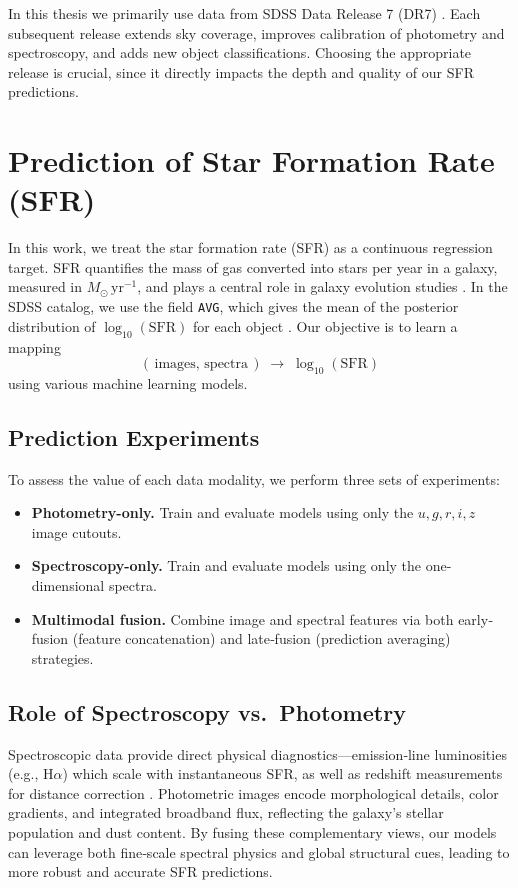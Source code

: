 \documentclass[english,bachelor,oneside]{ctufit-thesis}
\begin{document}
In this thesis we primarily use data from SDSS Data Release 7 (DR7) \cite{SDSSData19:online}.  
Each subsequent release extends sky coverage, improves calibration of photometry and spectroscopy,  
and adds new object classifications. Choosing the appropriate release is crucial,  
since it directly impacts the depth and quality of our SFR predictions.

\section{Prediction of Star Formation Rate (SFR)} 
In this work, we treat the star formation rate (SFR) as a continuous regression target.  
SFR quantifies the mass of gas converted into stars per year in a galaxy, measured in  
$M_{\odot}\,\mathrm{yr}^{-1}$, and plays a central role in galaxy evolution studies  
\cite{kennicutt1998star}. In the SDSS catalog, we use the field \texttt{AVG}, which gives  
the mean of the posterior distribution of $\log_{10}(\mathrm{SFR})$ for each object  
\cite{Rawdata46:online}. Our objective is to learn a mapping 
\[
  (\,\text{images},\,\text{spectra}\,)\;\longrightarrow\;\log_{10}(\mathrm{SFR})
\]
using various machine learning models.

\subsection{Prediction Experiments} %
To assess the value of each data modality, we perform three sets of experiments:
\begin{itemize}
  \item \textbf{Photometry-only.} Train and evaluate models using only the $u,g,r,i,z$ image cutouts.
  \item \textbf{Spectroscopy-only.} Train and evaluate models using only the one-dimensional spectra.
  \item \textbf{Multimodal fusion.} Combine image and spectral features via both early‐fusion  
        (feature concatenation) and late‐fusion (prediction averaging) strategies.
\end{itemize}

\subsection{Role of Spectroscopy vs.\ Photometry} %
Spectroscopic data provide direct physical diagnostics—emission‐line luminosities (e.g., H$\alpha$)  
which scale with instantaneous SFR, as well as redshift measurements for distance correction  
\cite{kennicutt1998star}. Photometric images encode morphological details, color gradients, and  
integrated broadband flux, reflecting the galaxy’s stellar population and dust content.  
By fusing these complementary views, our models can leverage both fine‐scale spectral physics  
and global structural cues, leading to more robust and accurate SFR predictions.
\end{document}
